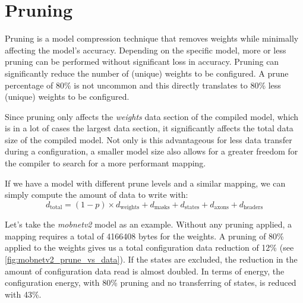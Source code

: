 \section{Pruning}
Pruning is a model compression technique that removes weights while minimally affecting the model's accuracy.
Depending on the specific model, more or less pruning can be performed without significant loss in accuracy.
Pruning can significantly reduce the number of (unique) weights to be configured.
A prune percentage of 80\% is not uncommon and this directly translates to 80\% less (unique) weights to be configured.

Since pruning only affects the \textit{weights} data section of the compiled model, which is in a lot of cases the largest data section, it significantly affects the total data size of the compiled model.
Not only is this advantageous for less data transfer during a configuration, a smaller model size also allows for a greater freedom for the compiler to search for a more performant mapping.

If we have a model with different prune levels and a similar mapping, we can simply compute the amount of data to write with:
\begin{equation}
    d_\textrm{total} = (1-p) \times d_\textrm{weights} + d_\textrm{masks} + d_\textrm{states} + d_\textrm{axons} + d_\textrm{headers}
\end{equation}

Let's take the \textit{mobnetv2} model as an example.
Without any pruning applied, a mapping requires a total of \num{4166408} bytes for the weights.
A pruning of 80\% applied to the weights gives us a total configuration data reduction of 12\% (see \cref{fig:mobnetv2_prune_vs_data}).
If the states are excluded, the reduction in the amount of configuration data read is almost doubled.
In terms of energy, the configuration energy, with 80\% pruning and no transferring of states, is reduced with 43\%.  

